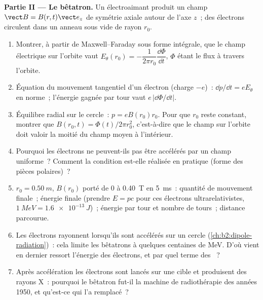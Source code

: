 \begin{problem}
\medskip
\noindent\textbf{Partie II --- Le bêtatron.}
Un électroaimant produit un champ $\vect B = B(r, t)\vect e_z$ de symétrie
axiale autour de l'axe $z$~; des électrons circulent dans un anneau sous vide de rayon $r_0$.
\begin{enumerate}[resume]
  \item Montrer, à partir de Maxwell--Faraday sous forme intégrale, que le
        champ électrique sur l'orbite vaut $E_\theta(r_0) = -\dfrac1{2\pi r_0}
        \dfrac{\dd\Phi}{\dd t}$, $\Phi$ étant le flux à travers l'orbite.
  \item Équation du mouvement tangentiel d'un électron (charge $-e$)~:
        $\dd p/\dd t = eE_\theta$ en norme~; l'énergie gagnée par tour vaut
        $e\,|\dd\Phi/\dd t|$.
  \item Équilibre radial sur le cercle~: $p = eB(r_0)r_0$. Pour que $r_0$
        reste constant, montrer que $B(r_0, t) = \Phi(t)/2\pi r_0^2$, c'est-à-dire que le
        champ sur l'orbite doit valoir la moitié du champ moyen à l'intérieur.
  \item Pourquoi les électrons ne peuvent-ils pas être accélérés par un champ uniforme~?
        Comment la condition est-elle réalisée en pratique (forme des pièces
        polaires)~?
  \item $r_0 = \qty{0.50}{m}$, $B(r_0)$ porté de $0$ à \qty{0.40}{T} en
        \qty{5}{ms}~: quantité de mouvement finale~; énergie finale (prendre $E = pc$ pour ces
        électrons ultrarelativistes, $\qty{1}{MeV} = \qty{1.6e-13}{J}$)~;
        énergie par tour et nombre de tours~; distance parcourue.
  \item Les électrons rayonnent lorsqu'ils sont accélérés sur un cercle
        (\cref{ch:b2:dipole-radiation})~: cela limite les bêtatrons à quelques
        centaines de MeV. D'où vient en dernier ressort l'énergie des électrons,
        et par quel terme des ~?
  \item Après accélération les électrons sont lancés sur une cible et
        produisent des rayons X~: pourquoi le bêtatron fut-il la machine de radiothérapie
        des années 1950, et qu'est-ce qui l'a remplacé~?
\end{enumerate}


\end{problem}
